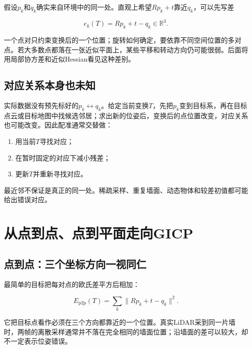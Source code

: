 假设$p_k$和$q_k$确实来自环境中的同一处。直观上希望$Rp_k+t$靠近$q_k$，可以先写差

\begin{equation*}
e_k(T)=Rp_k+t-q_k\in\mathbb R^3.
\end{equation*}

一个点对只约束变换后的一个位置；旋转如何确定，要依靠不同空间位置的多对点。若大多数点都落在一张近似平面上，某些平移和转动方向仍可能很弱。后面将用局部协方差和近似Hessian看见这种差别。

\subsection{对应关系本身也未知}

实际数据没有预先标好的$p_k\leftrightarrow q_k$。给定当前变换$T$，先把$p_k$变到目标系，再在目标点云或目标地图中找候选邻居；求出新的位姿后，变换后的点位置改变，对应关系也可能改变。因此配准通常交替做：

\begin{enumerate}

\item 用当前$T$寻找对应；

\item 在暂时固定的对应下减小残差；

\item 更新$T$并重新寻找对应。

\end{enumerate}

最近邻不保证是真正的同一处。稀疏采样、重复墙面、动态物体和较差初值都可能给出错误对应。

\section{从点到点、点到平面走向GICP}

\subsection{点到点：三个坐标方向一视同仁}

最简单的目标把每对点的欧氏差平方后相加：

\begin{equation*}
E_{\mathrm{p2p}}(T)=\sum_k\|Rp_k+t-q_k\|^2.
\end{equation*}

它把目标点看作必须在三个方向都靠近的一个位置。真实LiDAR采到同一片墙时，两帧的离散采样通常并不落在完全相同的墙面位置；沿墙面的差可以较大，却不一定表示位姿错误。

